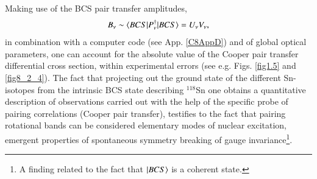 Making use of the BCS pair transfer amplitudes,
\begin{align}\label{eq0.1.104}
B_\nu\sim\langle {BCS|P^\dagger_\nu|BCS} \rangle=U_\nu V_\nu,
\end{align}
in combination with a computer code (see App. \ref{C8AppD}) and of global optical parameters, one can account for the  absolute value of the Cooper pair transfer differential cross section, within experimental errors (see e.g. Figs. \ref{fig1.5} and   \ref{fig8_2_4}). The fact that projecting out the ground state of the   different Sn-isotopes from the intrinsic BCS state describing $^{118}$Sn one obtains a quantitative description of observations carried out with the help of the specific probe of pairing correlations (Cooper pair transfer), testifies to the fact that pairing rotational bands can be considered elementary modes of nuclear excitation, emergent properties of spontaneous symmetry breaking of  gauge invariance\footnote{A finding related to the fact that $|{BCS} \rangle$ is a coherent state.}. 

